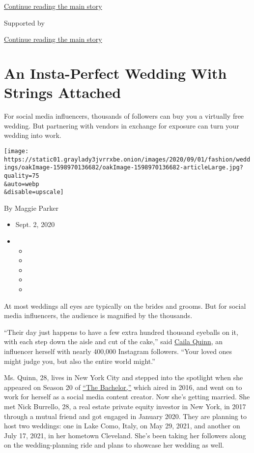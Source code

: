 \protect\hyperlink{after-top}{Continue reading the main story}

Supported by

\protect\hyperlink{after-sponsor}{Continue reading the main story}

\hypertarget{an-insta-perfect-wedding-with-strings-attached}{%
\section{An Insta-Perfect Wedding With Strings
Attached}\label{an-insta-perfect-wedding-with-strings-attached}}

For social media influencers, thousands of followers can buy you a
virtually free wedding. But partnering with vendors in exchange for
exposure can turn your wedding into work.

\texttt{[image: https://static01.graylady3jvrrxbe.onion/images/2020/09/01/fashion/weddings/oakImage-1598970136682/oakImage-1598970136682-articleLarge.jpg?quality=75\\\&auto=webp\\\&disable=upscale]}

By Maggie Parker

\begin{itemize}
\item
  Sept. 2, 2020
\item
  \begin{itemize}
  \item
  \item
  \item
  \item
  \item
  \end{itemize}
\end{itemize}

At most weddings all eyes are typically on the brides and grooms. But
for social media influencers, the audience is magnified by the
thousands.

``Their day just happens to have a few extra hundred thousand eyeballs
on it, with each step down the aisle and cut of the cake,'' said
\href{https://www.instagram.com/cailaquinn/}{Caila Quinn}, an influencer
herself with nearly 400,000 Instagram followers. ``Your loved ones might
judge you, but also the entire world might.''

\begin{quote}
\end{quote}

Ms. Quinn, 28, lives in New York City and stepped into the spotlight
when she appeared on Season 20 of
\href{https://www.nytimes3xbfgragh.onion/2018/02/26/style/bachelor-nation.html}{``The
Bachelor,''} which aired in 2016, and went on to work for herself as a
social media content creator. Now she's getting married. She met Nick
Burrello, 28, a real estate private equity investor in New York, in 2017
through a mutual friend and got engaged in January 2020. They are
planning to host two weddings: one in Lake Como, Italy, on May 29, 2021,
and another on July 17, 2021, in her hometown Cleveland. She's been
taking her followers along on the wedding-planning ride and plans to
showcase her wedding as well.

